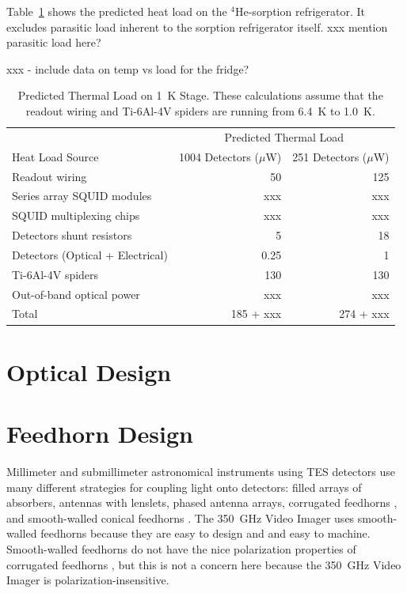 \documentclass[10pt,twocolumn,article]{memoir}
\newcommand*{\tableref}[1]{Table~\ref{#1}}
\newcommand*{\TES}{{\small TES}\xspace}
\newcommand*{\SQUID}{{\small SQUID}\xspace}
\newcommand*{\He}[1]{$^{#1}$He\xspace}
\newcommand*{\uW}{\ensuremath{\mu}W\xspace}
\newcommand*{\Imager}{350~GHz Video Imager\xspace}
\begin{document}
\tableref{tab:fp-thermal-load} shows the predicted heat load on the \He4-sorption refrigerator.
It excludes parasitic load inherent to the sorption refrigerator itself. xxx mention parasitic load here?

xxx - include data on temp vs load for the fridge?

\begin{table}[ht]
\centering
\caption{Predicted Thermal Load on 1~K Stage. These calculations assume that the readout wiring and Ti-6Al-4V spiders are running from 6.4~K to 1.0~K.}
\label{tab:fp-thermal-load}
\begin{tabular}{@{}lrr@{}}
\toprule
 & \multicolumn{2}{c}{Predicted Thermal Load} \\
\cmidrule(r){2-3}
Heat Load Source & 1004 Detectors (\uW) &  251 Detectors (\uW) \\
\midrule
Readout wiring 								& 50 & 125 \\
Series array \SQUID modules 		& xxx & xxx \\
\SQUID multiplexing chips 				& xxx & xxx \\
Detectors shunt resistors 			& 5 & 18 \\
Detectors (Optical + Electrical)		& 0.25 & 1 \\
Ti-6Al-4V spiders 							& 130 & 130 \\
Out-of-band optical power 			& xxx & xxx \\
\midrule
Total												& 185 + xxx & 274 + xxx \\
\bottomrule
\end{tabular}
\end{table}

\section{Optical Design}\label{s:optical-design}


\section{Feedhorn Design}\label{s:feedhorn-design}


Millimeter and submillimeter astronomical instruments using \TES detectors use many different strategies for coupling light onto detectors: filled arrays of absorbers\cite{swetz2011overview,Holland2013SCUBA-2}, antennas with lenslets\cite{polarbear?}, phased antenna arrays\cite{jpl stuff}, corrugated feedhorns \cite{sptpol,actpol}, and smooth-walled conical feedhorns \cite{schwan2011invited,spt}.
The \Imager uses smooth-walled feedhorns because they are easy to design and and easy to machine.
Smooth-walled feedhorns do not have the nice polarization properties of corrugated feedhorns \cite{claricoats & olver?}, but this is not a concern here because the \Imager is polarization-insensitive.
\end{document}
